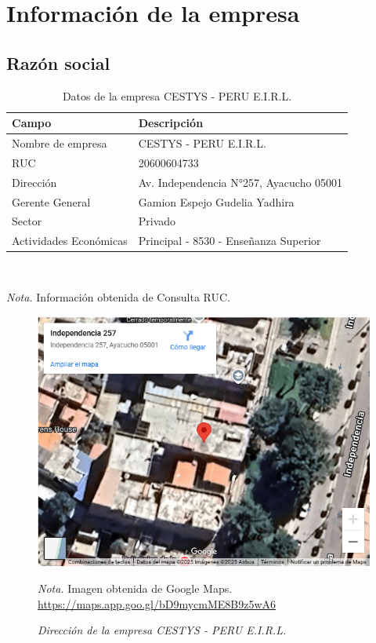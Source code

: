 \section{Información de la empresa}

\subsection{Razón social}

\begin{table}[H]
	\centering
	\caption{Datos de la empresa CESTYS - PERU E.I.R.L.}
	\label{tab:datos_empresa}
	\begin{tabular}{@{}p{5cm} p{9cm}@{}}
		\toprule
		\textbf{Campo} & \textbf{Descripción} \\
		\midrule
		Nombre de empresa & CESTYS - PERU E.I.R.L. \\
		RUC & 20600604733 \\
		Dirección & Av. Independencia N°257, Ayacucho 05001 \\
		Gerente General & Gamion Espejo Gudelia Yadhira \\
		Sector & Privado \\
		Actividades Económicas & Principal - 8530 - Enseñanza Superior \\
		\bottomrule
	\end{tabular}
	\\
	\vspace{0.5\baselineskip} %
	\raggedright \textit{Nota.} Información obtenida de Consulta RUC.
\end{table}



\begin{figure}[H]
	\centering
	\caption{\textit{Dirección de la empresa CESTYS - PERU E.I.R.L.}}
	\includegraphics[width=0.6\linewidth]{Figuras/11-08-08-2025-11.png}
	\\ 
	\raggedright \textit{Nota.} Imagen obtenida de Google Maps. 
	\url{https://maps.app.goo.gl/bD9mycmME8B9z5wA6}
	\label{fig:ubicacion_empresa}
\end{figure}

